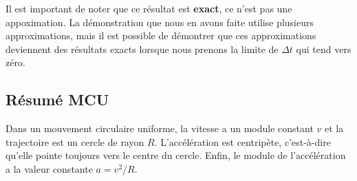\documentclass{tufte-handout}
\begin{document}
Il est important de noter que ce résultat est \textbf{exact}, ce n'est pas une
appoximation.  La démonstration que nous en avons faite utilise plusieurs
approximations, mais il est possible de démontrer que ces approximations
deviennent des résultats exacts lorsque nous prenons la limite de $\Delta t$
qui tend vers zéro.


\subsection{Résumé MCU}

Dans un mouvement circulaire uniforme, la vitesse a un module constant $v$ et
la trajectoire est un cercle de rayon $R$.  L'accélération est centripète,
c'est-à-dire qu'elle pointe toujours vers le centre du cercle.  Enfin, le
module de l'accélération a la valeur constante $a = v^2/R$.
\end{document}
